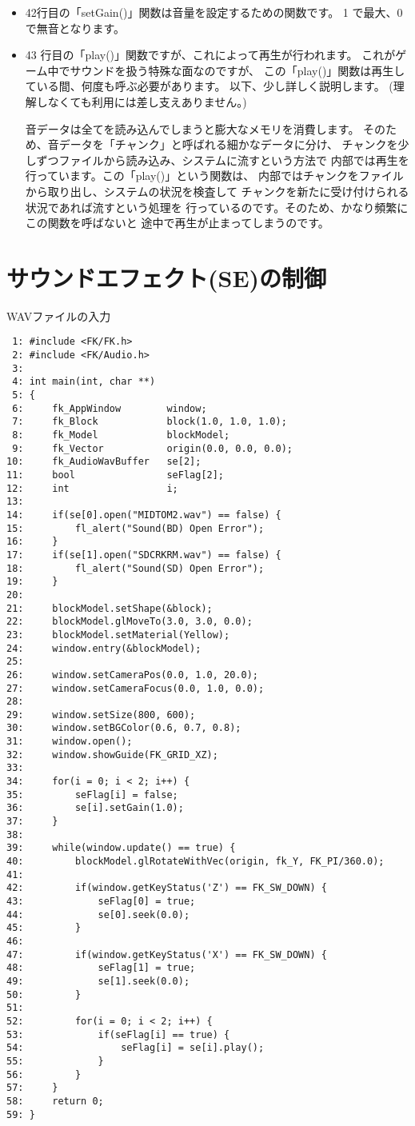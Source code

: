 \begin{itemize}
 \item 42行目の「setGain()」関数は音量を設定するための関数です。
	1 で最大、0 で無音となります。

 \item 43 行目の「play()」関数ですが、これによって再生が行われます。
	これがゲーム中でサウンドを扱う特殊な面なのですが、
	この「play()」関数は再生している間、何度も呼ぶ必要があります。
	以下、少し詳しく説明します。
	(理解しなくても利用には差し支えありません。)

	音データは全てを読み込んでしまうと膨大なメモリを消費します。
	そのため、音データを「チャンク」と呼ばれる細かなデータに分け、
	チャンクを少しずつファイルから読み込み、システムに流すという方法で
	内部では再生を行っています。この「play()」という関数は、
	内部ではチャンクをファイルから取り出し、システムの状況を検査して
	チャンクを新たに受け付けられる状況であれば流すという処理を
	行っているのです。そのため、かなり頻繁にこの関数を呼ばないと
	途中で再生が止まってしまうのです。

\end{itemize}
\section{サウンドエフェクト(SE)の制御} \label{sec:10-wav}
\begin{itembox}[l]{WAVファイルの入力}
\begin{footnotesize}
\begin{verbatim}
 1: #include <FK/FK.h>
 2: #include <FK/Audio.h>
 3: 
 4: int main(int, char **)
 5: {
 6:     fk_AppWindow        window;
 7:     fk_Block            block(1.0, 1.0, 1.0);
 8:     fk_Model            blockModel;
 9:     fk_Vector           origin(0.0, 0.0, 0.0);
10:     fk_AudioWavBuffer   se[2];
11:     bool                seFlag[2];
12:     int                 i;
13: 
14:     if(se[0].open("MIDTOM2.wav") == false) {
15:         fl_alert("Sound(BD) Open Error");
16:     }
17:     if(se[1].open("SDCRKRM.wav") == false) {
18:         fl_alert("Sound(SD) Open Error");
19:     }
20: 
21:     blockModel.setShape(&block);
22:     blockModel.glMoveTo(3.0, 3.0, 0.0);
23:     blockModel.setMaterial(Yellow);
24:     window.entry(&blockModel);
25: 
26:     window.setCameraPos(0.0, 1.0, 20.0);
27:     window.setCameraFocus(0.0, 1.0, 0.0);
28: 
29:     window.setSize(800, 600);
30:     window.setBGColor(0.6, 0.7, 0.8);
31:     window.open();
32:     window.showGuide(FK_GRID_XZ);
33: 
34:     for(i = 0; i < 2; i++) {
35:         seFlag[i] = false;
36:         se[i].setGain(1.0);
37:     }
38: 
39:     while(window.update() == true) {
40:         blockModel.glRotateWithVec(origin, fk_Y, FK_PI/360.0);
41: 
42:         if(window.getKeyStatus('Z') == FK_SW_DOWN) {
43:             seFlag[0] = true;
44:             se[0].seek(0.0);
45:         }
46: 
47:         if(window.getKeyStatus('X') == FK_SW_DOWN) {
48:             seFlag[1] = true;
49:             se[1].seek(0.0);
50:         }
51: 
52:         for(i = 0; i < 2; i++) {
53:             if(seFlag[i] == true) {
54:                 seFlag[i] = se[i].play();
55:             }
56:         }
57:     }
58:     return 0;
59: }
\end{verbatim}
\end{footnotesize}
\end{itembox}
